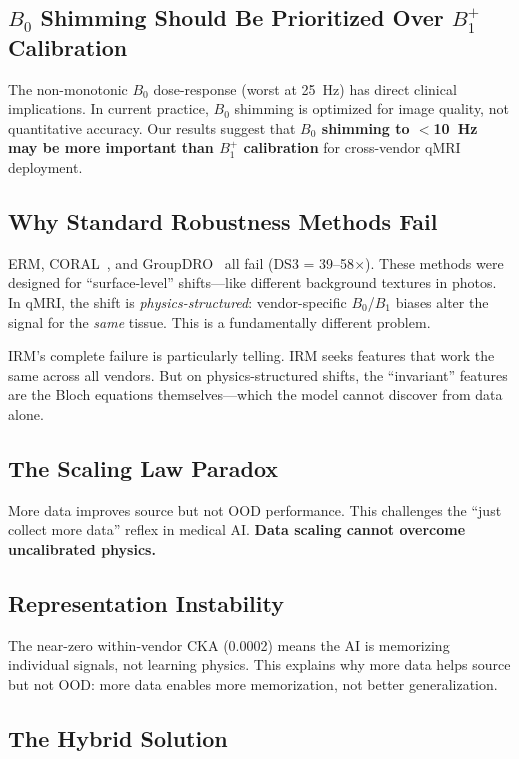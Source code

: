 \documentclass[11pt,a4paper]{article}
\begin{document}
\subsection{$B_0$ Shimming Should Be Prioritized Over $B_1^+$ Calibration}

The non-monotonic $B_0$ dose-response (worst at 25~Hz) has direct
clinical implications. In current practice, $B_0$ shimming is optimized
for image quality, not quantitative accuracy. Our results suggest that
\textbf{$B_0$ shimming to $<$10~Hz may be more important than $B_1^+$
calibration} for cross-vendor qMRI deployment.

\subsection{Why Standard Robustness Methods Fail}

ERM, CORAL~\cite{sun2016deep}, and GroupDRO~\cite{sagawa2020distributionally}
all fail (DS3 = 39--58$\times$). These
methods were designed for ``surface-level'' shifts---like different
background textures in photos. In qMRI, the shift is
\emph{physics-structured}: vendor-specific $B_0$/$B_1$ biases alter
the signal for the \emph{same} tissue. This is a fundamentally
different problem.

IRM's complete failure is particularly telling. IRM seeks features that
work the same across all vendors. But on physics-structured shifts, the
``invariant'' features are the Bloch equations themselves---which the
model cannot discover from data alone.

\subsection{The Scaling Law Paradox}

More data improves source but not OOD performance. This challenges the
``just collect more data'' reflex in medical AI. \textbf{Data scaling
cannot overcome uncalibrated physics.}

\subsection{Representation Instability}

The near-zero within-vendor CKA (0.0002) means the AI is memorizing
individual signals, not learning physics. This explains why more data
helps source but not OOD: more data enables more memorization, not
better generalization.

\subsection{The Hybrid Solution}
\end{document}
